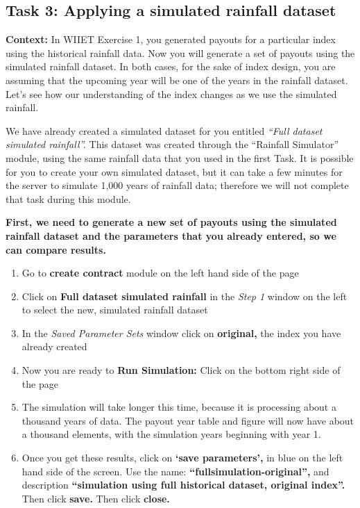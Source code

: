 \documentclass[letterpaper,10pt,english]{sphinxmanual}
\begin{document}
\subsection{Task 3: Applying a simulated rainfall dataset}
\label{wiiet/wiiet_influenceshortdatasets_Web:task-3-applying-a-simulated-rainfall-dataset}
\textbf{Context:} In WIIET Exercise 1, you generated payouts for a particular index using the historical rainfall data. Now you will generate a set of payouts using the simulated rainfall dataset. In both cases, for the sake of index design, you are assuming that the upcoming year will be one of the years in the rainfall dataset. Let's see how our understanding of the index changes as we use the simulated rainfall.

We have already created a simulated dataset for you entitled \emph{``Full dataset simulated rainfall''.} This dataset was created through the ``Rainfall Simulator'' module, using the same rainfall data that you used in the first Task. It is possible for you to create your own simulated dataset, but it can take a few minutes for the server to simulate 1,000 years of rainfall data; therefore we will not complete that task during this module.

\textbf{First, we need to generate a new set of payouts using the simulated rainfall dataset and the parameters that you already entered, so we can compare results.}
\begin{enumerate}
\item {} 
Go to \textbf{create contract} module on the left hand side of the page

\item {} 
Click on \textbf{Full dataset simulated rainfall} in the \emph{Step 1} window on the left to select the new, simulated rainfall dataset

\item {} 
In the \emph{Saved Parameter Sets} window click on \textbf{original,} the index you have already created

\item {} 
Now you are ready to \textbf{Run Simulation:} Click on the bottom right side of the page

\item {} 
The simulation will take longer this time, because it is processing about a thousand years of data. The payout year table and figure will now have about a thousand elements, with the simulation years beginning with year 1.

\item {} 
Once you get these results, click on \textbf{`save parameters',} in blue on the left hand side of the screen.  Use the name: \textbf{``fullsimulation-original'',} and description \textbf{``simulation using full historical dataset, original index''.} Then click \textbf{save.} Then click \textbf{close.}

\end{enumerate}
\end{document}
